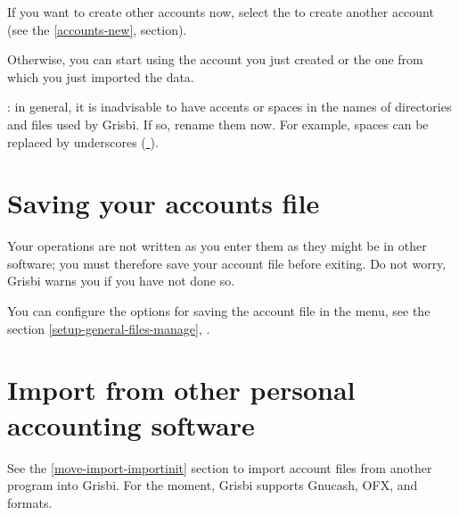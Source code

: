 
If you want to create other accounts now, select the  to create another account (see the \vref{accounts-new},  section).


Otherwise, you can start using the account you just created or the one from which you just imported the data.


 : in general, it is inadvisable to have accents or spaces in the names of directories and files used by Grisbi. If so, rename them now. For example, spaces can be replaced by underscores (\underline{ }).

\newpage


\section{Saving your accounts file\label{start-save}}

Your operations are not written as you enter them as they might be in other software; you must therefore save your account file before exiting. Do not worry, Grisbi warns you if you have not done so.

You can configure the options for saving the account file in the   menu, see the section \vref{setup-general-files-manage}, .


\section{Import from other personal accounting software}

See the \vref{move-import-importinit} section to import account files from another program into Grisbi. For the moment, Grisbi supports \gls{Gnucash}, \gls{OFX},  and  formats.


